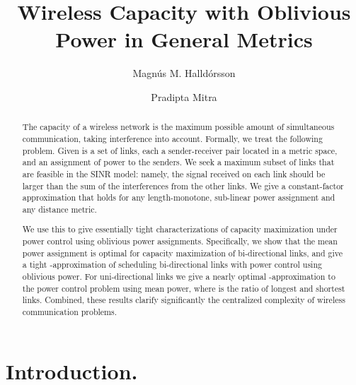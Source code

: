\documentclass[11pt]{amsart}
\begin{document}
\title[Wireless Capacity in General Metrics]{Wireless Capacity with Oblivious Power in General Metrics}


\author[M. Halld\'orsson]{Magn\'us M. Halld\'orsson}
\address[M. Halld\'orsson]{School of Computer Science\\
Reykjavik University\\
Reykjavik 101, Iceland}

\author[P. Mitra]{Pradipta Mitra}
\address[P. Mitra]{School of Computer Science\\
Reykjavik University\\
Reykjavik 101, Iceland}



\begin{abstract} 
\small
The capacity of a wireless network is the maximum possible amount of
simultaneous communication, taking interference into account. 
Formally, we treat the following problem.  Given is a set of links,
each a sender-receiver pair located in a metric space, and an assignment
of power to the senders.  We seek a maximum subset of links that are
feasible in the SINR model: namely, the signal received on each link
should be larger than the sum of the interferences from the other
links.  We give a constant-factor approximation that holds for any
length-monotone, sub-linear power assignment and any distance metric.

We use this to give essentially tight characterizations of capacity
maximization under power control using oblivious power assignments.
Specifically, we show that the mean power assignment is optimal for
capacity maximization of bi-directional links, and give a tight
-approximation of scheduling bi-directional links with
power control using oblivious power. For uni-directional links we give
a nearly optimal -approximation to the
power control problem using mean power, where  is the ratio of
longest and shortest links. Combined, these results clarify
significantly the centralized complexity of wireless communication
problems.
\end{abstract}



\maketitle



\section{Introduction.}
\end{document}
